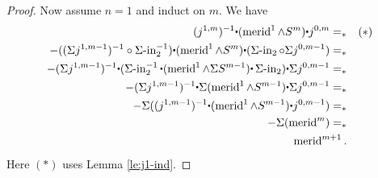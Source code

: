 \documentclass{amsart}
\theoremstyle{definition}
\newcommand{\merid}{\operatorname{merid}}
\newcommand{\siin}{\operatorname{\Sigma-in}}
\newcommand{\whisk}{\raisebox{0.5ex}{$\displaystyle\centerdot$}}
\begin{document}
\begin{proof}
    Now assume $n=1$ and induct on $m$. We have
    \begin{align*}
    ({j^{1,m}})^{-1} \whisk (\merid^1 \wedge S^m) \whisk j^{0, m} =_* && (*) \\
    -((\Sigma {j^{1,m-1}})^{-1} \circ \siin_2^{-1}) \whisk (\merid^1 \wedge S^m) \whisk (\siin_2 \circ \Sigma j^{0,m-1}) =_* \\
    -(\Sigma {j^{1,m-1}})^{-1} \whisk (\siin_2^{-1} \whisk (\merid^1 \wedge \Sigma S^{m-1}) \whisk \siin_2) \whisk \Sigma j^{0,m-1} =_* \\
    -(\Sigma {j^{1,m-1}})^{-1} \whisk \Sigma(\merid^1 \wedge S^{m-1}) \whisk \Sigma j^{0,m-1} =_* \\
    -\Sigma (({j^{1,m-1}})^{-1} \whisk (\merid^1 \wedge S^{m-1}) \whisk j^{0,m-1}) =_* \\
    -\Sigma (\merid^{m}) =_* \\
    \merid^{m+1}.
    \end{align*}
    Here $(*)$ uses Lemma \ref{le:j1-ind}.
\end{proof}
\end{document}
